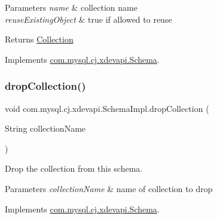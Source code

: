 \begin{DoxyParams}{Parameters}
{\em name} & collection name \\
\hline
{\em reuse\+Existing\+Object} & true if allowed to reuse \\
\hline
\end{DoxyParams}
\begin{DoxyReturn}{Returns}
\mbox{\hyperlink{interfacecom_1_1mysql_1_1cj_1_1xdevapi_1_1_collection}{Collection}} 
\end{DoxyReturn}


Implements \mbox{\hyperlink{interfacecom_1_1mysql_1_1cj_1_1xdevapi_1_1_schema_a81c42de36893c03f73f130ec5d7080f5}{com.\+mysql.\+cj.\+xdevapi.\+Schema}}.

\mbox{\label{classcom_1_1mysql_1_1cj_1_1xdevapi_1_1_schema_impl_a8420b65714f543e4bd4a113edeadeb14}} 
\subsubsection{\texorpdfstring{drop\+Collection()}{dropCollection()}}
{\footnotesize\ttfamily void com.\+mysql.\+cj.\+xdevapi.\+Schema\+Impl.\+drop\+Collection (\begin{DoxyParamCaption}\item[{String}]{collection\+Name }\end{DoxyParamCaption})}

Drop the collection from this schema.


\begin{DoxyParams}{Parameters}
{\em collection\+Name} & name of collection to drop \\
\hline
\end{DoxyParams}


Implements \mbox{\hyperlink{interfacecom_1_1mysql_1_1cj_1_1xdevapi_1_1_schema_aed2eef7be93416d42ed6b1d6c86bccdd}{com.\+mysql.\+cj.\+xdevapi.\+Schema}}.

\mbox{\label{classcom_1_1mysql_1_1cj_1_1xdevapi_1_1_schema_impl_af8aa5d4ff38f013efaa8b38955b6327d}} 
